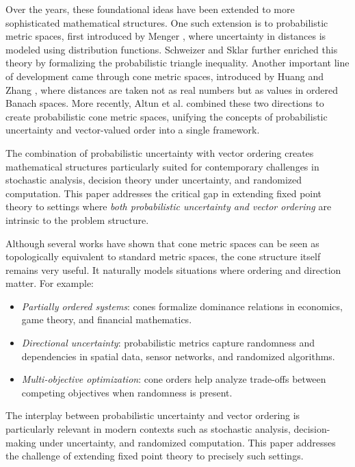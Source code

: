 \documentclass{amsart}
\theoremstyle{definition}
\theoremstyle{remark}
\numberwithin{equation}{section}
\begin{document}
Over the years, these foundational ideas have been extended to more sophisticated mathematical structures. One such extension is to probabilistic metric spaces, first introduced by Menger \cite{Menger1942}, where uncertainty in distances is modeled using distribution functions. Schweizer and Sklar \cite{Schweizer1983} further enriched this theory by formalizing the probabilistic triangle inequality. Another important line of development came through cone metric spaces, introduced by Huang and Zhang \cite{Huang2007}, where distances are taken not as real numbers but as values in ordered Banach spaces. More recently, Altun et al. \cite{Altun2010} combined these two directions to create probabilistic cone metric spaces, unifying the concepts of probabilistic uncertainty and vector-valued order into a single framework.

The combination of probabilistic uncertainty with vector ordering creates mathematical structures particularly suited for contemporary challenges in stochastic analysis, decision theory under uncertainty, and randomized computation. This paper addresses the critical gap in extending fixed point theory to settings where \textit{both probabilistic uncertainty and vector ordering} are intrinsic to the problem structure.

Although several works \cite{Matei2010, Du2010, Kadelburg2011, Asadi2012} have shown that cone metric spaces can be seen as topologically equivalent to standard metric spaces, the cone structure itself remains very useful. It naturally models situations where ordering and direction matter. For example:
\begin{itemize}
\item \textit{Partially ordered systems}:  cones formalize dominance relations in economics, game theory, and financial mathematics.

\item \textit{Directional uncertainty}: probabilistic metrics capture randomness and dependencies in spatial data, sensor networks, and randomized algorithms.

\item \textit{Multi-objective optimization}: cone orders help analyze trade-offs between competing objectives when randomness is present.
\end{itemize}
The interplay between probabilistic uncertainty and vector ordering is particularly relevant in modern contexts such as stochastic analysis, decision-making under uncertainty, and randomized computation. This paper addresses the challenge of extending fixed point theory to precisely such settings.
\end{document}
